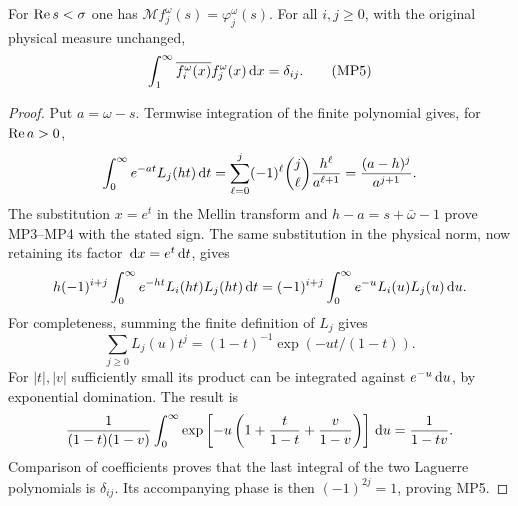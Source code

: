 \documentclass[11pt]{article}
\begin{document}
\begin{swpolelemma}
For $\operatorname{Re} s<\sigma$ one has $\mathcal Mf_j^\omega(s)=\varphi_j^\omega(s)$.
For all $i,j\geq0$, with the original physical measure unchanged,
\begin{equation}
 \int_1^\infty\overline{f_i^\omega(x)}f_j^\omega(x)\,\mathrm d x=\delta_{ij}.
 \tag{MP5}
\end{equation}
\end{swpolelemma}
\begin{proof}
Put $a=\omega-s$. Termwise integration of the finite polynomial gives,
for $\operatorname{Re} a>0$,
\[
 \int_0^\infty e^{-at}L_j(ht)\,\mathrm d t
 =\sum_{\ell=0}^j(-1)^\ell\binom j\ell\frac{h^\ell}{a^{\ell+1}}
 =\frac{(a-h)^j}{a^{j+1}}.
\]
The substitution $x=e^t$ in the Mellin transform and
$h-a=s+\bar\omega-1$ prove MP3--MP4 with the stated sign.
The same substitution in the physical norm, now retaining its factor
$\,\mathrm d x=e^t\,\mathrm d t$, gives
\[
 h(-1)^{i+j}\int_0^\infty e^{-ht}L_i(ht)L_j(ht)\,\mathrm d t
 =(-1)^{i+j}\int_0^\infty e^{-u}L_i(u)L_j(u)\,\mathrm d u.
\]
For completeness, summing the finite definition of $L_j$ gives
\[
\sum_{j\geq0}L_j(u)t^j=(1-t)^{-1}\exp(-ut/(1-t)).
\]
For $|t|,|v|$ sufficiently small its product can be integrated against
$e^{-u}\,\mathrm d u$, by exponential domination. The result is
\[
 \frac1{(1-t)(1-v)}
 \int_0^\infty\exp\left[-u\left(1+\frac t{1-t}
                         +\frac v{1-v}\right)\right]\,\mathrm d u
 =\frac1{1-tv}.
\]
Comparison of coefficients proves that the last integral of the two
Laguerre polynomials is $\delta_{ij}$. Its accompanying phase is then
$(-1)^{2j}=1$, proving MP5.
\end{proof}
\end{document}
